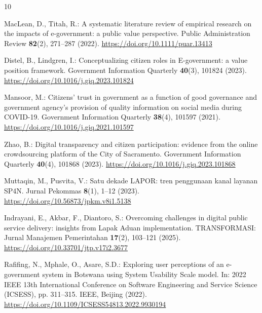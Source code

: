 \documentclass[11pt, runningheads, a4paper]{llncs}
\begin{document}
\enlargethispage{3.5\baselineskip}
\begin{thebibliography}{10}
\fontsize{7.2pt}{8.4pt}\selectfont
\setlength{\itemsep}{-0.5pt}
\setlength{\parsep}{0pt}
\setlength{\parskip}{0pt}

MacLean, D., Titah, R.: A systematic literature review of empirical research on
the impacts of e-government: a public value perspective. Public Administration
Review \textbf{82}(2), 271--287 (2022).
\url{https://doi.org/10.1111/puar.13413}

Distel, B., Lindgren, I.: Conceptualizing citizen roles in E-government: a value
position framework. Government Information Quarterly \textbf{40}(3), 101824 (2023).
\url{https://doi.org/10.1016/j.giq.2023.101824}

Mansoor, M.: Citizens' trust in government as a function of good governance and
government agency's provision of quality information on social media during
COVID-19. Government Information Quarterly \textbf{38}(4), 101597 (2021).
\url{https://doi.org/10.1016/j.giq.2021.101597}

Zhao, B.: Digital transparency and citizen participation: evidence from the
online crowdsourcing platform of the City of Sacramento. Government Information
Quarterly \textbf{40}(4), 101868 (2023).
\url{https://doi.org/10.1016/j.giq.2023.101868}

Muttaqin, M., Pusvita, V.: Satu dekade LAPOR: tren penggunaan kanal layanan SP4N.
Jurnal Pekommas \textbf{8}(1), 1--12 (2023).
\url{https://doi.org/10.56873/jpkm.v8i1.5138}

Indrayani, E., Akbar, F., Diantoro, S.: Overcoming challenges in digital public
service delivery: insights from Lapak Aduan implementation. TRANSFORMASI: Jurnal
Manajemen Pemerintahan \textbf{17}(2), 103--121 (2025).
\url{https://doi.org/10.33701/jtp.v17i2.3677}

Rafifing, N., Mphale, O., Asare, S.D.: Exploring user perceptions of an e-government
system in Botswana using System Usability Scale model. In: 2022 IEEE 13th
International Conference on Software Engineering and Service Science (ICSESS),
pp. 311--315. IEEE, Beijing (2022).
\url{https://doi.org/10.1109/ICSESS54813.2022.9930194}


\end{thebibliography}
\end{document}
